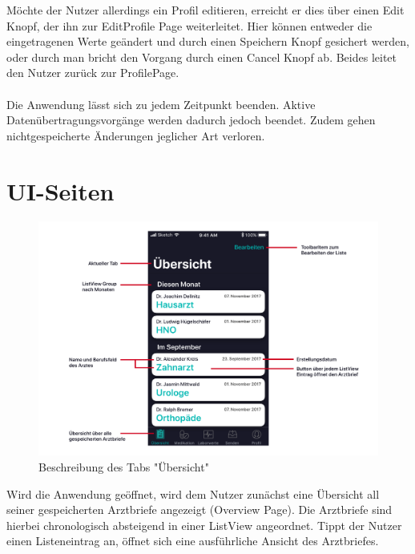 \documentclass[a4paper]{scrreprt}
\begin{document}
Möchte der Nutzer allerdings ein Profil editieren, erreicht er dies über einen Edit Knopf, der ihn zur EditProfile Page weiterleitet. Hier können entweder die eingetragenen Werte geändert und durch einen Speichern Knopf gesichert werden, oder durch man bricht den Vorgang durch einen Cancel Knopf ab. Beides leitet den Nutzer zurück zur ProfilePage.
\\
\\
Die Anwendung lässt sich zu jedem Zeitpunkt beenden. Aktive Datenübertragungsvorgänge werden dadurch jedoch beendet. Zudem gehen nichtgespeicherte Änderungen jeglicher Art verloren.



\section{UI-Seiten}
\begin{figure}[H]
\centering
\includegraphics[width=1\textwidth]{graphics/UIDescriptions/OverviewDesc}
\caption{Beschreibung des Tabs "Übersicht"}
\vspace{0.5cm}
\end{figure}
Wird die Anwendung geöffnet, wird dem Nutzer zunächst eine Übersicht all seiner gespeicherten Arztbriefe angezeigt (Overview Page). Die Arztbriefe sind hierbei chronologisch absteigend in einer ListView angeordnet. Tippt der Nutzer einen Listeneintrag an, öffnet sich eine ausführliche Ansicht des Arztbriefes.
\end{document}
